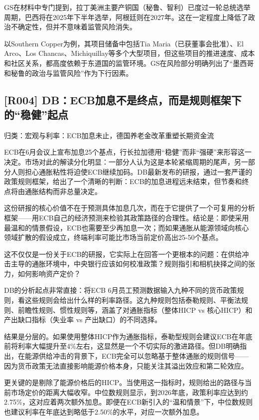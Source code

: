 \documentclass[11pt]{ctexart}
\begin{document}
GS在材料中专门提到，拉丁美洲主要产铜国（秘鲁、智利）已度过一轮总统选举周期，巴西将在2025年下半年选举，阿根廷则在2027年。这在一定程度上降低了政治不确定性，但并不意味着监管风险消失。

以Southern Copper为例，其项目储备中包括Tia Maria（已获董事会批准）、El Arco、Los Chancas、Michiquillay等多个大型项目，但这些项目的推进速度、成本和社区关系，都高度依赖于东道国的监管环境。GS在风险部分明确列出了“墨西哥和秘鲁的政治与监管风险”作为下行因素。

\subsection{[R004] DB：ECB加息不是终点，而是规则框架下的“稳健”起点}
{\small\color{refgray}归类：宏观与利率：ECB加息未止，德国养老金改革重塑长期资金流}

ECB在6月会议上宣布加息25个基点，行长拉加德用“稳健”而非“强硬”来形容这一决定。市场对此的解读分化明显：一部分人认为这是本轮紧缩周期的尾声，另一部分人则担心通胀粘性将迫使ECB继续加码。DB最新发布的研报，通过一套严谨的政策规则框架，给出了一个清晰的判断：ECB的加息进程远未结束，但节奏和终点将由通胀结构而非总量决定。

这份研报的核心价值不在于预测具体加息几次，而在于它提供了一个可复用的分析框架——用ECB自己的经济预测来检验其政策路径的合理性。结论是：即使采用最温和的情景假设，ECB也需要至少再加息一次；而如果通胀从能源领域向核心领域扩散的假设成立，终端利率可能比市场当前定价高出25-50个基点。

这不仅仅是一份关于ECB的研报，它实际上在回答一个更根本的问题：在供给冲击主导的通胀环境中，中央银行应该如何校准政策？规则指引和相机抉择之间的张力，如何影响资产定价？

DB的分析起点非常直接：将ECB 6月员工预测数据输入九种不同的货币政策规则，看这些规则会给出什么样的利率路径。这九种规则包括泰勒规则、平衡法规则、前瞻性规则、惯性规则等，涵盖了对通胀指标（整体HICP vs 核心HICP）和产出缺口指标（失业率 vs 产出缺口）的不同选择。

结果是分层的。如果使用整体HICP作为通胀指标，泰勒型规则会建议ECB在年底前将利率大幅提升至4\%左右，这显然是一个不切实际的激进路径。但DB明确指出，在能源供给冲击的背景下，ECB完全可以忽略基于整体通胀的规则信号——因为货币政策无法直接影响能源价格本身，只能关注其溢出效应和第二轮效应。

更关键的是剔除了能源价格后的HICP。当使用这一指标时，规则给出的路径与当前市场定价的距离大幅收窄。中位数规则显示，到2026年底，政策利率应达到约2.75\%，这对应着两次额外加息。即便在ECB新引入的“温和情景”下，中位数规则也建议利率在年底达到略低于2.50\%的水平，对应一次额外加息。
\end{document}
